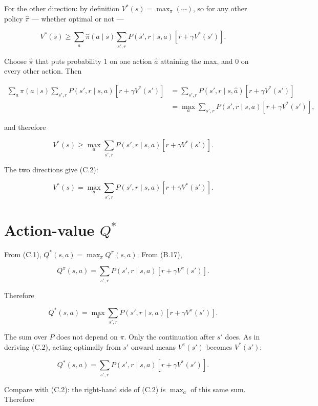 For the other direction: by definition $V^*(s)=\max_\pi(\cdots)$, so for any other policy $\hat{\pi}$ --- whether optimal or not ---

\[
V^*(s)
\ge
\sum_a \hat{\pi}(a \mid s)
\sum_{s',r}
P(s',r \mid s,a)
\left[
r + \gamma V^*(s')
\right].
\]

Choose $\hat{\pi}$ that puts probability $1$ on one action $\hat{a}$ attaining the max, and $0$ on every other action. Then

\[
\begin{aligned}
\sum_a \hat{\pi}(a \mid s)
\sum_{s',r}
P(s',r \mid s,a)
\left[
r + \gamma V^*(s')
\right]
&=
\sum_{s',r}
P(s',r \mid s,\hat{a})
\left[
r + \gamma V^*(s')
\right] \\
&=
\max_a
\sum_{s',r}
P(s',r \mid s,a)
\left[
r + \gamma V^*(s')
\right],
\end{aligned}
\]

and therefore

\[
V^*(s)
\ge
\max_a
\sum_{s',r}
P(s',r \mid s,a)
\left[
r + \gamma V^*(s')
\right].
\]

The two directions give (C.2):

\begin{equation}
V^*(s)
=
\max_a
\sum_{s',r}
P(s',r \mid s,a)
\left[
r + \gamma V^*(s')
\right].
\tag{C.2}\label{eq:C.2}
\end{equation}

\section{Action-value $Q^*$}

From (C.1), $Q^*(s,a)=\max_\pi Q^\pi(s,a)$. From (B.17),

\[
Q^\pi(s,a)
=
\sum_{s',r}
P(s',r \mid s,a)
\left[
r + \gamma V^\pi(s')
\right].
\]

Therefore

\[
Q^*(s,a)
=
\max_\pi
\sum_{s',r}
P(s',r \mid s,a)
\left[
r + \gamma V^\pi(s')
\right].
\]

The sum over $P$ does not depend on $\pi$. Only the continuation after $s'$ does. As in deriving (C.2), acting optimally from $s'$ onward means $V^\pi(s')$ becomes $V^*(s')$:

\begin{equation}
Q^*(s,a)
=
\sum_{s',r}
P(s',r \mid s,a)
\left[
r + \gamma V^*(s')
\right].
\tag{C.3}
\end{equation}

Compare with (C.2): the right-hand side of (C.2) is $\max_a$ of this same sum. Therefore

